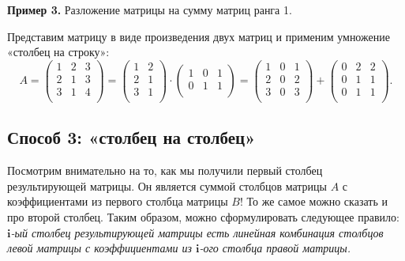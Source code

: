 \documentclass[11pt,a4paper]{article}
\begin{document}
    \textbf{Пример 3.} Разложение матрицы на сумму матриц ранга 1.

Представим матрицу в виде произведения двух матриц и применим умножение
«столбец на строку»: \[
  A = 
  \begin{pmatrix}
     1 & 2 & 3 \\
     2 & 1 & 3 \\
     3 & 1 & 4 \\
  \end{pmatrix}
  =
  \begin{pmatrix}
     1 & 2 \\
     2 & 1 \\
     3 & 1 \\
  \end{pmatrix}
  \cdot
  \begin{pmatrix}
     1 & 0 & 1 \\
     0 & 1 & 1 \\
  \end{pmatrix}
  =
  \begin{pmatrix}
     1 & 0 & 1 \\
     2 & 0 & 2 \\
     3 & 0 & 3 \\
  \end{pmatrix}
  +
  \begin{pmatrix}
     0 & 2 & 2 \\
     0 & 1 & 1 \\
     0 & 1 & 1 \\
  \end{pmatrix}.
\]

    \hypertarget{ux441ux43fux43eux441ux43eux431-3-ux441ux442ux43eux43bux431ux435ux446-ux43dux430-ux441ux442ux43eux43bux431ux435ux446}{%
\subsection{Способ 3: «столбец на
столбец»}\label{ux441ux43fux43eux441ux43eux431-3-ux441ux442ux43eux43bux431ux435ux446-ux43dux430-ux441ux442ux43eux43bux431ux435ux446}}

Посмотрим внимательно на то, как мы получили первый столбец
результирующей матрицы. Он является суммой столбцов матрицы \(A\) с
коэффициентами из первого столбца матрицы \(B\)! То же самое можно
сказать и про второй столбец. Таким образом, можно сформулировать
следующее правило:\\
\emph{\(\mathbf{i}\)-ый столбец результирующей матрицы есть линейная
комбинация столбцов левой матрицы с коэффициентами из \(\mathbf{i}\)-ого
столбца правой матрицы.}
\end{document}
